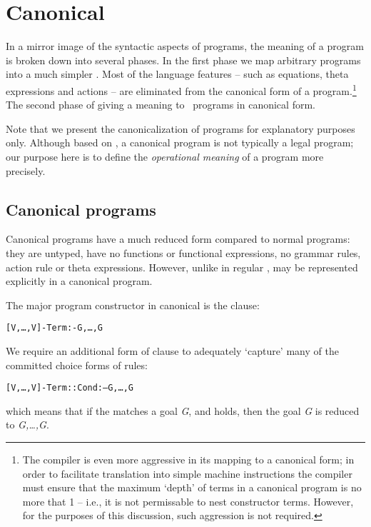 \chapter{Canonical \go}
\label{canonical}

In a mirror image of the syntactic aspects of \go programs, the meaning of a \go program is broken down into several phases. In the first phase we map arbitrary \go programs into a much simpler . Most of the \go language features -- such as equations, theta expressions and actions -- are eliminated from the canonical form of a program.\footnote{The \go compiler is even more aggressive in its mapping to a canonical form; in order to facilitate translation into simple machine instructions the compiler must ensure that the maximum `depth' of terms in a canonical program is no more that 1 -- i.e., it is not permissable to nest constructor terms. However, for the purposes of this discussion, such aggression is not required.} The second phase of giving a meaning to \go\ programs in canonical form.

Note that we present the canonicalization of \go programs for explanatory purposes only. Although based on \go, a canonical \go program is not typically a legal \go program; our purpose here is to define the \emph{operational meaning} of a \go program more precisely.

\section{Canonical \go programs}
\label{canonical:canonical}

Canonical \go programs have a much reduced form compared to normal \go programs: they are untyped, have no functions or functional expressions, no grammar rules, action rule or theta expressions. However, unlike in regular \go,  may be represented explicitly in a canonical program.

The major program constructor in canonical \go is the clause:
\begin{alltt}
[V,\ldots,V\subn]-Term :- G,\ldots,G
\end{alltt}
We require an additional form of clause to adequately `capture' many of the committed choice forms of rules:
\begin{alltt}
[V,\ldots,V\subn]-Term::Cond :-- G,\ldots,G
\end{alltt}
which means that if the  matches a goal \emph{G}, and  holds, then the goal \emph{G} is reduced to \emph{G,\ldots,G\subn}.

